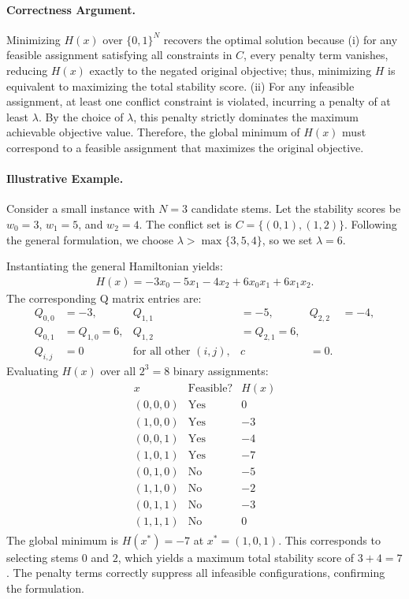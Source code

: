 \documentclass[12pt]{article}
\begin{document}
\paragraph{Correctness Argument.}
Minimizing $H(x)$ over $\{0,1\}^N$ recovers the optimal solution because (i) for any feasible assignment satisfying all constraints in $C$, every penalty term vanishes, reducing $H(x)$ exactly to the negated original objective; thus, minimizing $H$ is equivalent to maximizing the total stability score. (ii) For any infeasible assignment, at least one conflict constraint is violated, incurring a penalty of at least $\lambda$. By the choice of $\lambda$, this penalty strictly dominates the maximum achievable objective value. Therefore, the global minimum of $H(x)$ must correspond to a feasible assignment that maximizes the original objective.

\paragraph{Illustrative Example.}
Consider a small instance with $N=3$ candidate stems. Let the stability scores be $w_0 = 3$, $w_1 = 5$, and $w_2 = 4$. The conflict set is $C = \{(0,1), (1,2)\}$. Following the general formulation, we choose $\lambda > \max\{3, 5, 4\}$, so we set $\lambda = 6$.

Instantiating the general Hamiltonian yields:
\begin{align}
    H(x) = -3x_0 - 5x_1 - 4x_2 + 6x_0 x_1 + 6x_1 x_2.
\end{align}
The corresponding Q matrix entries are:
\begin{align}
    Q_{0,0} &= -3, & Q_{1,1} &= -5, & Q_{2,2} &= -4, \\
    Q_{0,1} &= Q_{1,0} = 6, & Q_{1,2} &= Q_{2,1} = 6, \\
    Q_{i,j} &= 0 & \text{for all other } (i,j), & c &= 0.
\end{align}
Evaluating $H(x)$ over all $2^3 = 8$ binary assignments:
\begin{align}
    \begin{array}{c|c|c}
    x & \text{Feasible?} & H(x) \\ \hline
    (0,0,0) & \text{Yes} & 0 \\
    (1,0,0) & \text{Yes} & -3 \\
    (0,0,1) & \text{Yes} & -4 \\
    (1,0,1) & \text{Yes} & -7 \\
    (0,1,0) & \text{No} & -5 \\
    (1,1,0) & \text{No} & -2 \\
    (0,1,1) & \text{No} & -3 \\
    (1,1,1) & \text{No} & 0
    \end{array}
\end{align}
The global minimum is $H(x^*) = -7$ at $x^* = (1,0,1)$. This corresponds to selecting stems $0$ and $2$, which yields a maximum total stability score of $3 + 4 = 7$. The penalty terms correctly suppress all infeasible configurations, confirming the formulation.
\end{document}
